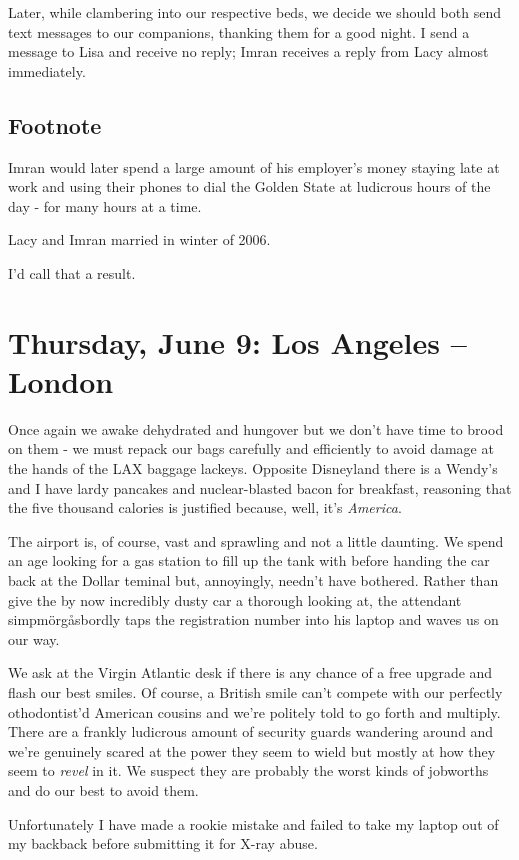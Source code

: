 \documentclass[a5paper,titlepage,11pt]{book}
\begin{document}
Later, while clambering into our respective beds, we decide we should both send text messages to our companions, thanking them for a good night.  I send a message to Lisa and receive no reply; Imran receives a reply from Lacy almost immediately.

\section*{Footnote}
Imran would later spend a large amount of his employer's money staying late at work and using their phones to dial the Golden State at ludicrous hours of the day - for many hours at a time.

Lacy and Imran married in winter of 2006.

I'd call that a result.


\chapter[Los Angeles -- London]{Thursday, June 9: Los Angeles -- London}
Once again we awake dehydrated and hungover but we don't have time to brood on them - we must repack our bags carefully and efficiently to avoid damage at the hands of the LAX baggage lackeys.  Opposite Disneyland there is a Wendy's and I have lardy pancakes and nuclear-blasted bacon for breakfast, reasoning that the five thousand calories is justified because, well, it's \emph{America}.

The airport is, of course, vast and sprawling and not a little daunting.  We spend an age looking for a gas station to fill up the tank with before handing the car back at the Dollar teminal but, annoyingly, needn't have bothered.  Rather than give the by now incredibly dusty car a thorough looking at, the attendant simpmörgåsbordly taps the registration number into his laptop and waves us on our way.

We ask at the Virgin Atlantic desk if there is any chance of a free upgrade and flash our best smiles.  Of course, a British smile can't compete with our perfectly othodontist'd American cousins and we're politely told to go forth and multiply.  There are a frankly ludicrous amount of security guards wandering around and we're genuinely scared at the power they seem to wield but mostly at how they seem to \emph{revel} in it.  We suspect they are probably the worst kinds of jobworths and do our best to avoid them.

Unfortunately I have made a rookie mistake and failed to take my laptop out of my backback before submitting it for X-ray abuse.
\end{document}
